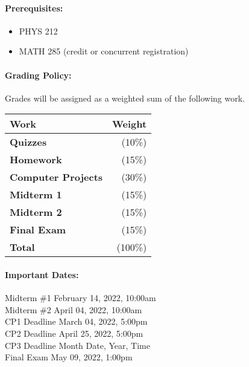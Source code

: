 \documentclass[11pt, a4paper]{article}
\begin{document}
\paragraph{Prerequisites:}
\begin{itemize}
\item PHYS 212
\item MATH 285 (credit or concurrent registration)
\end{itemize}

\paragraph{Grading Policy:} Grades will be assigned as a weighted sum of the following work.

\begin{table}[h]
\begin{tabularx}{\textwidth}{Xr}
\textbf{Work} & \textbf{Weight}\\
\hline
\textbf{Quizzes} & (10\%) \\
\textbf{Homework} & (15\%) \\
\textbf{Computer Projects} & (30\%) \\
\textbf{Midterm 1} & (15\%) \\
\textbf{Midterm 2} & (15\%) \\
\textbf{Final Exam} & (15\%) \\
\hline
\textbf{Total} & (100\%) \\
\end{tabularx}
\end{table}

\paragraph{Important Dates:}
\begin{center} \begin{minipage}{3.8in}
\begin{flushleft}
Midterm \#1       \dotfill February 14, 2022, 10:00am  \\
Midterm \#2       \dotfill April 04, 2022, 10:00am  \\
CP1 Deadline      \dotfill March 04, 2022, 5:00pm  \\
CP2 Deadline      \dotfill April 25, 2022, 5:00pm  \\
CP3 Deadline      \dotfill Month Date, Year, Time  \\
Final Exam        \dotfill May 09, 2022, 1:00pm  \\
\end{flushleft}
\end{minipage}
\end{center}
\end{document}
